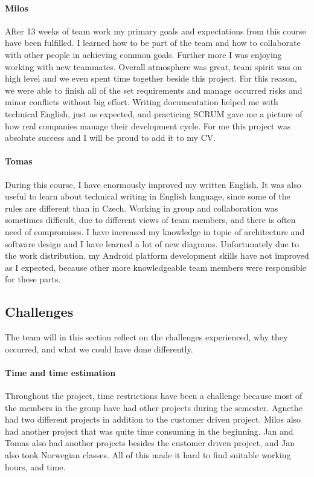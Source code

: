 \paragraph{Milos}
After 13 weeks of team work my primary goals and expectations from this course have been fulfilled. I learned how to be part of the team and how to collaborate with other people in achieving common goals. Further more I was enjoying working with new teammates. Overall atmosphere was great, team spirit was on high level and we even spent time together beside this project. For this reason, we were able to finish all of the set requirements and manage occurred risks and minor conflicts without big effort. Writing documentation helped me with technical English, just as expected, and practicing SCRUM gave me a picture of how real companies manage their development cycle. For me this project was absolute success and I will be proud to add it to my CV.

\paragraph{Tomas}
During this course, I have enormously improved my written English. 
It was also useful to learn about technical writing in English language, since some of the rules are different than in Czech.
Working in group and collaboration was sometimes difficult, due to different views of team members, and there is often need of compromises.
I have increased my knowledge in topic of architecture and software design and I have learned a lot of new diagrams.
Unfortunately due to the work distribution, my Android platform development skills have not improved as I expected, because other more knowledgeable team members were responsible for these parts.

\subsection{Challenges}
The team will in this section reflect on the challenges experienced, why they occurred, and what we could have done differently.

\paragraph{Time and time estimation}

Throughout the project, time restrictions have been a challenge because most of the members in the group have had other projects during the semester. Agnethe had two different projects in addition to the customer driven project. Milos also had another project that was quite time consuming in the beginning. Jan and Tomas also had another projects besides the customer driven project, and Jan also took Norwegian classes. All of this made it hard to find suitable working hours, and time. 

